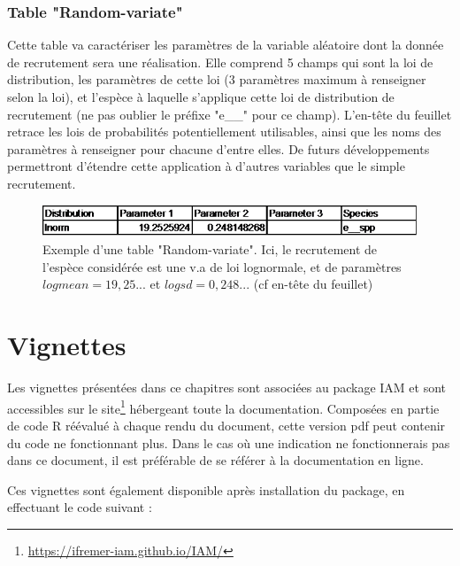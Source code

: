\documentclass[12pt, colorinlistoftodos, notitlepage]{report}
\newenvironment{not used}[1]{%
    \longtable{%
        |>{\centering$\displaystyle}A{#1}{1}<{$}%
        |}\hline\ignorespaces}{%
    \endlongtable\ignorespacesafterend}
\begin{document}
\subsection{Table "Random-variate"} \label{sec:rand}

Cette table va caractériser les paramètres de la variable aléatoire dont la donnée de recrutement sera une réalisation. Elle comprend 5 champs qui sont la loi de distribution, les paramètres de cette loi (3 paramètres maximum à renseigner selon la loi), et l'espèce à laquelle s'applique cette loi de distribution de recrutement (ne pas oublier le préfixe "e\_\_" pour ce champ). L'en-tête du feuillet retrace les lois de probabilités potentiellement utilisables, ainsi que les noms des paramètres à renseigner pour chacune d'entre elles. De futurs développements permettront d'étendre cette application à d'autres variables que le simple recrutement.

\begin{figure}[H]
    \begin{center}
    \includegraphics[width = 13.42cm]{figures/param/stock15.png}
    \end{center}
    \caption{Exemple d'une table "Random-variate". Ici, le recrutement de l'espèce considérée est une v.a de loi lognormale, et de paramètres $logmean=19,25...$ et $logsd=0,248...$ (cf en-tête du feuillet)}
    \label{fig:random}
\end{figure}

\chapter{Vignettes} \label{vignette}

\minitoc

Les vignettes présentées dans ce chapitres sont associées au package IAM et sont accessibles sur le site\footnote{\url{https://ifremer-iam.github.io/IAM/}} hébergeant toute la documentation. Composées en partie de code R réévalué à chaque rendu du document, cette version pdf peut contenir du code ne fonctionnant plus. Dans le cas où une indication ne fonctionnerais pas dans ce document, il est préférable de se référer à la documentation en ligne.

Ces vignettes sont également disponible après installation du package, en effectuant le code suivant :
\end{document}
